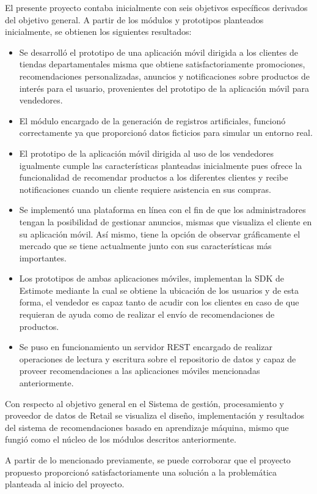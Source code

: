 El presente proyecto contaba inicialmente con seis objetivos específicos derivados del objetivo general.  A partir de los módulos y prototipos planteados inicialmente, se obtienen los siguientes resultados:

\begin{itemize}
\item Se desarrolló el prototipo de una aplicación móvil dirigida a los clientes de tiendas departamentales misma que obtiene satisfactoriamente promociones, recomendaciones personalizadas, anuncios y notificaciones sobre productos de interés para el usuario, provenientes del prototipo de la aplicación móvil para vendedores. 
\item El módulo encargado de la generación de registros artificiales, funcionó correctamente ya que proporcionó datos ficticios para simular un entorno real.
\item El prototipo de la aplicación móvil dirigida al uso de los vendedores igualmente cumple las características planteadas inicialmente pues ofrece la funcionalidad de recomendar productos a los diferentes clientes y recibe notificaciones cuando un cliente requiere asistencia en sus compras.
\item Se implementó una plataforma en línea con el fin de que los administradores tengan la posibilidad de gestionar anuncios, mismas que visualiza el cliente en su aplicación móvil. Así mismo, tiene la opción de observar gráficamente el mercado que se tiene actualmente junto con sus características más importantes.
\item Los prototipos de ambas aplicaciones móviles, implementan la SDK de Estimote mediante la cual se obtiene la ubicación de los usuarios y de esta forma, el vendedor es capaz tanto de acudir con los clientes en caso de que requieran de ayuda como de realizar el envío de recomendaciones de productos.
\item Se puso en funcionamiento un servidor REST encargado de realizar operaciones de lectura y escritura sobre el repositorio de datos y capaz de proveer recomendaciones a las aplicaciones móviles mencionadas anteriormente.
\end{itemize}
Con respecto al objetivo general en el Sistema de gestión, procesamiento y proveedor de datos de Retail se visualiza el diseño, implementación y resultados del sistema de recomendaciones basado en aprendizaje máquina, mismo que fungió como el núcleo de los módulos descritos anteriormente.

A partir de lo mencionado previamente, se puede corroborar que el proyecto propuesto proporcionó satisfactoriamente una solución a la problemática planteada al inicio del proyecto.
